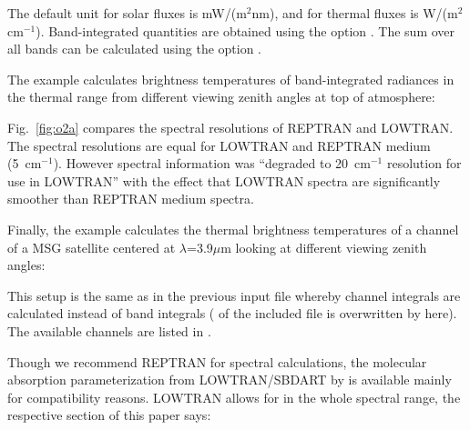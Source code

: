 The default unit for solar fluxes is mW/(m$^2$nm), and for thermal fluxes is W/(m$^2$cm$^{-1}$).
Band-integrated quantities are obtained using the option .
The sum over all bands can be calculated using the option .

The example  calculates brightness temperatures of band-integrated radiances in the thermal range
from different viewing zenith angles at top of atmosphere:


Fig.~\ref{fig:o2a} compares the spectral resolutions of REPTRAN and LOWTRAN.
The spectral resolutions are equal for LOWTRAN and REPTRAN medium (5~cm$^{-1}$). 
However spectral information was 
``degraded to 20~cm$^{-1}$ resolution for use in LOWTRAN'' \citep{Ricchiazzi1998b} with the effect that LOWTRAN spectra
are significantly smoother than REPTRAN medium spectra.

Finally, the example  calculates the thermal brightness temperatures of a channel of a MSG satellite centered at $\lambda$=3.9$\mu$m looking at different viewing zenith angles:


This setup is the same as in the previous input file whereby channel integrals are calculated instead of band integrals ( of the included file is overwritten by  here).
The available channels are listed in .

Though we recommend REPTRAN for spectral calculations, the molecular absorption parameterization from
LOWTRAN/SBDART by \citet{Ricchiazzi1998b} is available mainly for compatibility reasons.
LOWTRAN allows for  in the whole spectral range, the respective 
section of this paper says:

